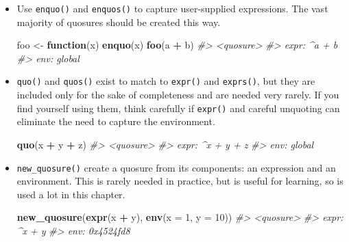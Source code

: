 \documentclass[]{book}
\makeatletter
\newenvironment{Shaded}{\begin{snugshade}}{\end{snugshade}}
\newcommand{\CommentTok}[1]{\textcolor[rgb]{0.37,0.37,0.37}{\textit{#1}}}
\newcommand{\ControlFlowTok}[1]{\textcolor[rgb]{0.27,0.27,0.27}{\textbf{#1}}}
\newcommand{\DataTypeTok}[1]{\textcolor[rgb]{0.27,0.27,0.27}{#1}}
\newcommand{\DecValTok}[1]{\textcolor[rgb]{0.06,0.06,0.06}{#1}}
\newcommand{\KeywordTok}[1]{\textcolor[rgb]{0.27,0.27,0.27}{\textbf{#1}}}
\newcommand{\NormalTok}[1]{#1}
\newcommand{\OperatorTok}[1]{\textcolor[rgb]{0.43,0.43,0.43}{\textbf{#1}}}
\newcommand{\StringTok}[1]{\textcolor[rgb]{0.5,0.5,0.5}{#1}}
\newcommand{\indexc}[1]{\index{#1@\texttt{#1}}}
\makeatother
\begin{document}
\begin{itemize}
\item
  Use \texttt{enquo()} and \texttt{enquos()} to capture user-supplied expressions.
  The vast majority of quosures should be created this way.

\begin{Shaded}
\begin{Highlighting}[]
\NormalTok{foo <-}\StringTok{ }\ControlFlowTok{function}\NormalTok{(x) }\KeywordTok{enquo}\NormalTok{(x)}
\KeywordTok{foo}\NormalTok{(a }\OperatorTok{+}\StringTok{ }\NormalTok{b)}
\CommentTok{#> <quosure>}
\CommentTok{#> expr: ^a + b}
\CommentTok{#> env:  global}
\end{Highlighting}
\end{Shaded}

  \indexc{enquo()}
\item
  \texttt{quo()} and \texttt{quos()} exist to match to \texttt{expr()} and \texttt{exprs()}, but
  they are included only for the sake of completeness and are needed very
  rarely. If you find yourself using them, think carefully if \texttt{expr()} and
  careful unquoting can eliminate the need to capture the environment.

\begin{Shaded}
\begin{Highlighting}[]
\KeywordTok{quo}\NormalTok{(x }\OperatorTok{+}\StringTok{ }\NormalTok{y }\OperatorTok{+}\StringTok{ }\NormalTok{z)}
\CommentTok{#> <quosure>}
\CommentTok{#> expr: ^x + y + z}
\CommentTok{#> env:  global}
\end{Highlighting}
\end{Shaded}

\item
  \texttt{new\_quosure()} create a quosure from its components: an expression and
  an environment. This is rarely needed in practice, but is useful for
  learning, so is used a lot in this chapter.

\begin{Shaded}
\begin{Highlighting}[]
\KeywordTok{new_quosure}\NormalTok{(}\KeywordTok{expr}\NormalTok{(x }\OperatorTok{+}\StringTok{ }\NormalTok{y), }\KeywordTok{env}\NormalTok{(}\DataTypeTok{x =} \DecValTok{1}\NormalTok{, }\DataTypeTok{y =} \DecValTok{10}\NormalTok{))}
\CommentTok{#> <quosure>}
\CommentTok{#> expr: ^x + y}
\CommentTok{#> env:  0x4524fd8}
\end{Highlighting}
\end{Shaded}
\end{itemize}
\end{document}
